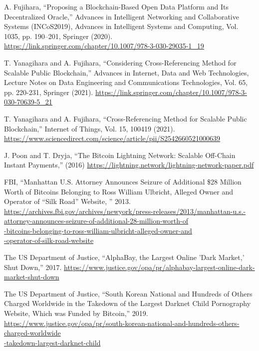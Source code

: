 \documentclass[graybox]{svmult}
\begin{document}
\begin{thebibliography}{99}
  A. Fujihara, 
  ``Proposing a Blockchain-Based Open Data Platform and Its Decentralized Oracle,''
  Advances in Intelligent Networking and Collaborative Systems (INCoS2019), 
  Advances in Intelligent Systems and Computing, 
  Vol. 1035, pp. 190--201, Springer (2020).
  \url{https://link.springer.com/chapter/10.1007/978-3-030-29035-1_19}


  T. Yanagihara and A. Fujihara, 
  ``Considering Cross-Referencing Method for Scalable Public Blockchain,''
  Advances in Internet, Data and Web Technologies, 
  Lecture Notes on Data Engineering and Communications Technologies, 
  Vol. 65, pp. 220-231, Springer (2021). 
  \url{https://link.springer.com/chapter/10.1007/978-3-030-70639-5_21}


  T. Yanagihara and A. Fujihara,
  ``Cross-Referencing Method for Scalable Public Blockchain,''
  Internet of Things, Vol. 15, 100419 (2021). 
  \url{https://www.sciencedirect.com/science/article/pii/S2542660521000639}





  J. Poon and T. Dryja, 
  ``The Bitcoin Lightning Network: Scalable Off-Chain Instant Payments,'' 
  (2016) \url{https://lightning.network/lightning-network-paper.pdf}


  FBI, 
  ``Manhattan U.S. Attorney Announces Seizure of Additional \$28 Million 
    Worth of Bitcoins Belonging to Ross William Ulbricht, Alleged Owner 
    and Operator of ``Silk Road'' Website, '' 2013.
  \url{https://archives.fbi.gov/archives/newyork/press-releases/2013/manhattan-u.s.-attorney-announces-seizure-of-additional-28-million-worth-of}\\
  \url{-bitcoins-belonging-to-ross-william-ulbricht-alleged-owner-and}\\
  \url{-operator-of-silk-road-website}

  The US Department of Justice,
  ``AlphaBay, the Largest Online 'Dark Market,' Shut Down,'' 2017.
  \url{https://www.justice.gov/opa/pr/alphabay-largest-online-dark-market-shut-down}

  The US Department of Justice,
  ``South Korean National and Hundreds of Others Charged Worldwide in the Takedown 
    of the Largest Darknet Child Pornography Website, Which was Funded by Bitcoin,'' 
  2019.
  \url{https://www.justice.gov/opa/pr/south-korean-national-and-hundreds-others-charged-worldwide}\\
  \url{-takedown-largest-darknet-child}




\end{thebibliography}
\end{document}
